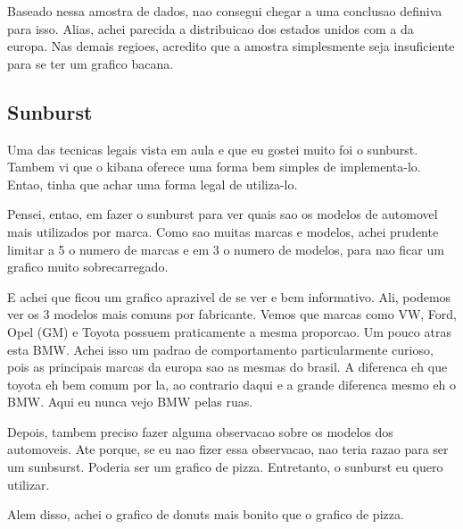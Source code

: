 \documentclass[10pt, conference]{IEEEtran}
\begin{document}
Baseado nessa amostra de dados, nao consegui chegar a uma conclusao definiva para isso. Alias, achei 
parecida a distribuicao dos estados unidos com a da europa. Nas demais regioes, acredito que a amostra
simplesmente seja insuficiente para se ter um grafico bacana.



\subsection{Sunburst}

Uma das tecnicas legais vista em aula e que eu gostei muito foi o sunburst. Tambem vi que o kibana
oferece uma forma bem simples de implementa-lo. Entao, tinha que achar uma forma legal de utiliza-lo.

Pensei, entao, em fazer o sunburst para ver quais sao os modelos de automovel mais utilizados por marca.
Como sao muitas marcas e modelos, achei prudente limitar a 5 o numero de marcas e em 3 o numero de modelos,
para nao ficar um grafico muito sobrecarregado. 

E achei que ficou um grafico aprazivel de se ver e bem informativo. Ali, podemos ver os 3 modelos mais
comuns por fabricante. Vemos que marcas como VW, Ford, Opel (GM) e Toyota possuem praticamente a mesma
proporcao. Um pouco atras esta BMW. Achei isso um padrao de comportamento particularmente curioso, pois
as principais marcas da europa sao as mesmas do brasil. A diferenca eh que toyota eh bem comum por la,
ao contrario daqui e a grande diferenca mesmo eh o BMW. Aqui eu nunca vejo BMW pelas ruas.

Depois, tambem preciso fazer alguma observacao sobre os modelos dos automoveis. Ate porque, se eu nao
fizer essa observacao, nao teria razao para ser um sunbsurst. Poderia ser um grafico de pizza.
Entretanto, o sunburst eu quero utilizar.

Alem disso, achei o grafico de donuts mais bonito que o grafico de pizza.





\end{document}
